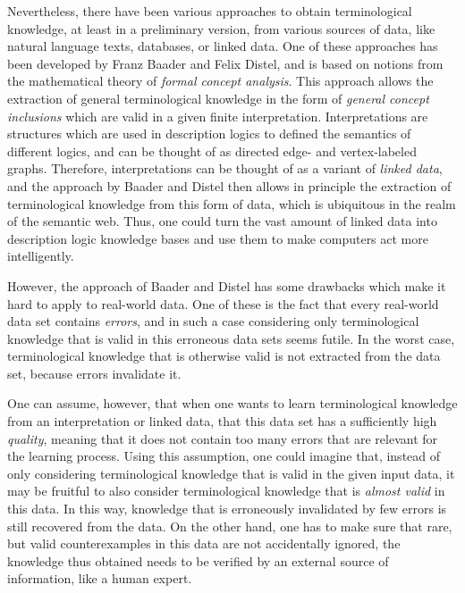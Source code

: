 Nevertheless, there have been various approaches to obtain terminological knowledge, at
least in a preliminary version, from various sources of data, like natural language texts,
databases, or linked data.  One of these approaches has been developed by Franz Baader and
Felix Distel, and is based on notions from the mathematical theory of \emph{formal concept
  analysis}.  This approach allows the extraction of general terminological knowledge in
the form of \emph{general concept inclusions} which are valid in a given finite
interpretation.  Interpretations are structures which are used in description logics to
defined the semantics of different logics, and can be thought of as directed edge- and
vertex-labeled graphs.  Therefore, interpretations can be thought of as a variant of
\emph{linked data}, and the approach by Baader and Distel then allows in principle the
extraction of terminological knowledge from this form of data, which is ubiquitous in the
realm of the semantic web.  Thus, one could turn the vast amount of linked data into
description logic knowledge bases and use them to make computers act more intelligently.

However, the approach of Baader and Distel has some drawbacks which make it hard to apply
to real-world data.  One of these is the fact that every real-world data set contains
\emph{errors}, and in such a case considering only terminological knowledge that is valid
in this erroneous data sets seems futile.  In the worst case, terminological knowledge
that is otherwise valid is not extracted from the data set, because errors invalidate it.

One can assume, however, that when one wants to learn terminological knowledge from an
interpretation or linked data, that this data set has a sufficiently high \emph{quality},
meaning that it does not contain too many errors that are relevant for the learning
process.  Using this assumption, one could imagine that, instead of only considering
terminological knowledge that is valid in the given input data, it may be fruitful to also
consider terminological knowledge that is \emph{almost valid} in this data.  In this way,
knowledge that is erroneously invalidated by few errors is still recovered from the data.
On the other hand, one has to make sure that rare, but valid counterexamples in this data
are not accidentally ignored, \ie the knowledge thus obtained needs to be verified by an
external source of information, like a human expert.

